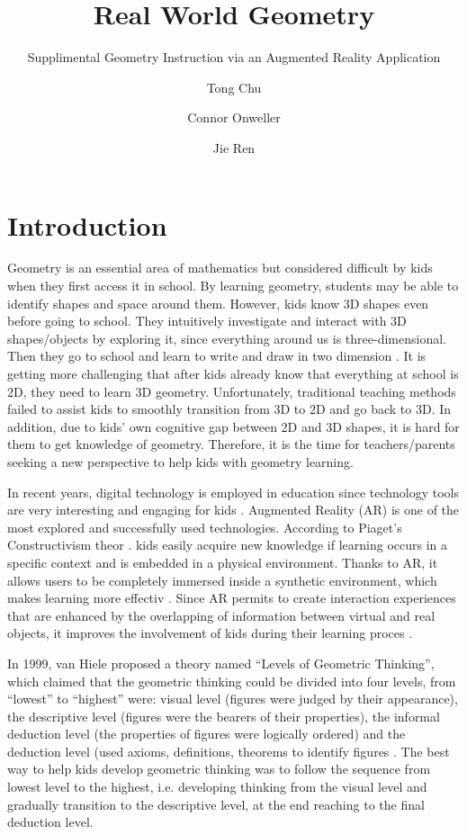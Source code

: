 \documentclass[manuscript, nonacm]{acmart}
\title{Real World Geometry}
\subtitle{Supplimental Geometry Instruction via an Augmented Reality Application}
\author{Tong Chu}
\author{Connor Onweller}
\author{Jie Ren}
\begin{document}
\maketitle

\section{Introduction}
\label{sec:introduction}

Geometry is an essential area of mathematics but considered difficult by kids
when they first access it in school.  By learning geometry, students may be able
to identify shapes and space around them.  However, kids know 3D shapes even
before going to school.  They intuitively investigate and interact with 3D
shapes/objects by exploring it, since everything around us is three-dimensional.
Then they go to school and learn to write and draw in two dimension
\cite{AR-3D-geometry}.  It is getting more challenging that after kids already
know that everything at school is 2D, they need to learn 3D geometry.
Unfortunately, traditional teaching methods failed to assist kids to smoothly
transition from 3D to 2D and go back to 3D.  In addition, due to kids’ own
cognitive gap between 2D and 3D shapes, it is hard for them to get knowledge of
geometry.  Therefore, it is the time for teachers/parents seeking a new
perspective to help kids with geometry learning.

In recent years, digital technology is employed in education since technology
tools are very interesting and engaging for kids \cite{game-based,
using-games-learning, game-based-learning, adaptive}. Augmented Reality (AR) is
one of the most explored and successfully used technologies.  According to
Piaget’s Constructivism theor \cite{psych-child}.  kids easily acquire new
knowledge if learning occurs in a specific context and is embedded in a physical
environment.  Thanks to AR, it allows users to be completely immersed inside a
synthetic environment, which makes learning more effectiv
\cite{situated-learning}.  Since AR permits to create interaction experiences
that are enhanced by the overlapping of information between virtual and real
objects, it improves the involvement of kids during their learning proces
\cite{AR-support-geometry}.

In 1999, van Hiele proposed a theory named “Levels of Geometric Thinking”, which
claimed that the geometric thinking could be divided into four levels, from
“lowest” to “highest” were: visual level (figures were judged by their
appearance), the descriptive level (figures were the bearers of their
properties), the informal deduction level (the properties of figures were
logically ordered) and the deduction level (used axioms, definitions, theorems
to identify figures \cite{developing-geometric-thinking}.  The best way to help
kids develop geometric thinking was to follow the sequence from lowest level to
the highest, i.e. developing thinking from the visual level and gradually
transition to the descriptive level, at the end reaching to the final deduction
level.
\end{document}
